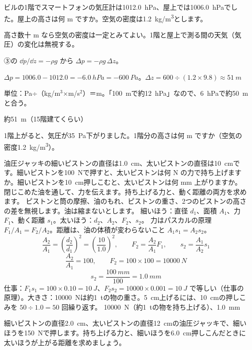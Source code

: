 \begin{reidai}[スマートフォンの気圧計で高さを測る]
\label{ph:力-12:ex5}ビルの1階でスマートフォンの気圧計は\qty{1012.0}{hPa}、屋上では\qty{1006.0}{hPa}でした。屋上の高さは何 m ですか。空気の密度は\qty{1.2}{kg/m^3}とします。
\par{} 高さ数十 m なら空気の密度は一定とみてよい。1階と屋上で測る間の天気（気圧）の変化は無視する。
\par\kangaekata ③の $\dd p/\dd z=-\rho g$ から $\Delta p=-\rho g\,\Delta z$。
\par\shiki $\Delta p=1006.0-1012.0=\qty{-6.0}{hPa}=\qty{-600}{Pa}$。$\Delta z=600\div (1.2\times9.8)\approx\qty{51}{m}$
\par{} 単位：Pa÷（kg/m$^3$×m/s$^2$）＝m。「\qty{100}{m}で約\qty{12}{hPa}」なので、\qty{6}{hPa}で約\qty{50}{m}と合う。
\par\kotae 約\qty{51}{m}（15階建てくらい）
\end{reidai}
\begin{jibun}
1階上がると、気圧が\qty{35}{Pa}下がりました。1階分の高さは何 m ですか（空気の密度\qty{1.2}{kg/m^3}）。
\end{jibun}

\begin{phreidai}[油圧ジャッキ]
\label{ph:力-12:ex6}油圧ジャッキの細いピストンの直径は\qty{1.0}{cm}、太いピストンの直径は\qty{10}{cm}です。細いピストンを\qty{100}{N}で押すと、太いピストンは何 N の力で持ち上げますか。細いピストンを\qty{10}{cm}押しこむと、太いピストンは何 mm 上がりますか。
\phbamen
閉じこめた油を通して、力を伝えます。持ち上げる力と、動く距離の両方を求めます。
\phmushi
ピストンと筒の摩擦、油のもれ、ピストンの重さ、2つのピストンの高さの差を無視します。油は縮まないとします。
\phzu
細いほう：直径 $d_1$、面積 $A_1$、力 $F_1$、動く距離 $s_1$。太いほう：$d_2$、$A_2$、$F_2$、$s_2$。
\phriyu
力はパスカルの原理 $F_1/A_1=F_2/A_2$。距離は、油の体積が変わらないこと $A_1s_1=A_2s_2$。
\phtateru
\[ \frac{A_2}{A_1}=\left(\frac{d_2}{d_1}\right)^2=\left(\frac{10}{1.0}\right)^2,\qquad F_2=\frac{A_2}{A_1}F_1,\qquad s_2=\frac{A_1}{A_2}s_1 \]
\phtoku
\[ \frac{A_2}{A_1}=100,\qquad F_2=100\times100=\qty{10000}{N} \]
\[ s_2=\frac{\qty{100}{mm}}{100}=\qty{1.0}{mm} \]
\phtashikame
仕事：$F_1s_1=100\times0.10=\qty{10}{J}$、$F_2s_2=\num{10000}\times0.001=\qty{10}{J}$ で等しい（仕事の原理）。大きさ：\qty{10000}{N}は約\qty{1}{t}の物の重さ。\qty{5}{cm}上げるには、\qty{10}{cm}の押しこみを $50\div1.0=50$ 回繰り返す。
\kotae \qty{10000}{N}（約\qty{1}{t}の物を持ち上げる）、\qty{1.0}{mm}
\end{phreidai}
\begin{jibun}
細いピストンの直径\qty{2.0}{cm}、太いピストンの直径\qty{12}{cm}の油圧ジャッキで、細いほうを\qty{150}{N}で押します。持ち上げる力と、細いほうを\qty{6.0}{cm}押しこんだときに太いほうが上がる距離を求めましょう。
\end{jibun}

